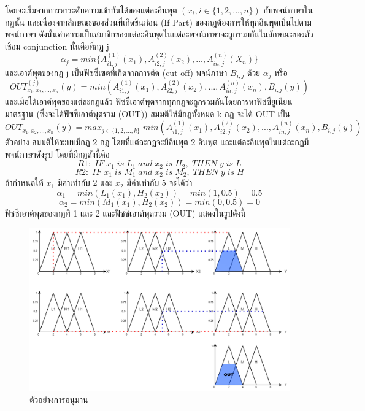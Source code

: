 โดยจะเริ่มจากการหาระดับความเข้ากันได้ของแต่ละอินพุต \((x_{i}, i \in \{1,2,...,n\})\) กับพจน์ภาษาในกฏนั้น และเนื่องจากลักษณะของส่วนที่เกิดขึ้นก่อน (If Part) ของกฏต้องการให้ทุกอินพุตเป็นไปตามพจน์ภาษา ดังนั้นค่าความเป็นสมาชิกของแต่ละอินพุตในแต่ละพจน์ภาษาจะถูกรวมกันในลักษณะของตัวเชื่อม conjunction นั่นคือที่กฏ j
\begin{equation}
\alpha_{j} = min\{A^{(1)}_{i1,j}(x_{1}), A^{(2)}_{i2,j}(x_{2}), ..., A^{(n)}_{in,j}(X_{n})\}
\end{equation}
และเอาต์พุตของกฏ j เป็นฟัซซีเซตที่เกิดจากการตัด (cut off) พจน์ภาษา \(B_{i,j}\) ด้วย \(\alpha_{j}\) หรือ
\begin{equation}
OUT^{(j)}_{x_{1},x_{2},...,x_{n}} (y) = min(A^{(1)}_{i1,j}(x_{1}), A^{(2)}_{i2,j}(x_{2}),...,A^{(n)}_{in,j}(x_{n}),B_{i,j}(y))
\end{equation}
และเมื่อได้เอาต์พุตของแต่ละกฏแล้ว ฟัซซีเอาต์พุตจากทุกกฏจะถูกรวมกันโดยการหาฟัซซียูเนียนมาตรฐาน (ซึ่งจะได้ฟัซซีเอาต์พุตรวม (OUT)) สมมติให้มีกฏทั้งหมด k กฏ จะได้ OUT เป็น
\begin{equation}
OUT_{x_{1},x_{2},...,x_{n}} (y) = max_{j \in \{1,2,...,k\}}\; min(A^{(1)}_{i1,j}(x_{1}), A^{(2)}_{i2,j}(x_{2}),...,A^{(n)}_{in,j}(x_{n}),B_{i,j}(y))
\end{equation}
ตัวอย่าง สมมติให้ระบบมีกฏ 2 กฏ โดยที่แต่ละกฏจะมีอินพุต 2 อินพุต และแต่ละอินพุตในแต่ละกฏมีพจน์ภาษาดังรูป โดยที่มีกฏดังนี้คือ
\[R1:\; IF\; x_{1}\; is\; L_{1}\; and\; x_{2}\; is\; H_{2},\; THEN\; y\; is\; L \]
\[R2:\; IF\; x_{1}\; is\; M_{1}\; and\; x_{2}\; is\; M_{2},\; THEN\; y\; is\; H \]
ถ้ากำหนดให้ \(x_{1}\) มีค่าเท่ากับ 2 และ \(x_{2}\) มีค่าเท่ากับ 5 จะได้ว่า
\[\alpha_{1} = min(L_{1}(x_{1}),H_{2}(x_{2})) = min (1,0.5) = 0.5\]
\[\alpha_{2} = min(M_{1}(x_{1}),H_{2}(x_{2})) = min (0,0.5) = 0\]ฟัซซีเอาต์พุตของกฏที่ 1 และ 2 และฟัซซีเอาต์พุตรวม (OUT) แสดงในรูปดังนี้
\begin{figure}[ht]
    \centering
    \includegraphics[scale=0.3]{images/ex_inference.png}
    \caption{ตัวอย่างการอนุมาน}
    \label{fig:4}
\end{figure}

